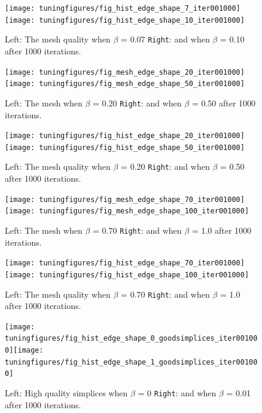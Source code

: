 \documentclass[10pt,a4paper]{book}
\begin{document}
\begin{figure}[tbhp]
\centerline{\texttt{[image: tuningfigures/fig\_hist\_edge\_shape\_7\_iter001000]}\hspace{3cm}\texttt{[image: tuningfigures/fig\_hist\_edge\_shape\_10\_iter001000]}}
\caption{\label{fig:fig_hist_edge_shape_7_iter001000} Left: The mesh quality when $\beta$ = 0.07 \texttt{Right}: and when $\beta$ = 0.10 after 1000 iterations.}
\end{figure}

\begin{figure}[tbhp]
\centerline{\texttt{[image: tuningfigures/fig\_mesh\_edge\_shape\_20\_iter001000]}\hspace{3cm}\texttt{[image: tuningfigures/fig\_mesh\_edge\_shape\_50\_iter001000]}}
\caption{\label{fig:fig_mesh_edge_shape_20_iter001000} Left: The mesh when $\beta$ = 0.20 \texttt{Right}: and when $\beta$ = 0.50 after 1000 iterations.}
\end{figure}

\begin{figure}[tbhp]
\centerline{\texttt{[image: tuningfigures/fig\_hist\_edge\_shape\_20\_iter001000]}\hspace{3cm}\texttt{[image: tuningfigures/fig\_hist\_edge\_shape\_50\_iter001000]}}
\caption{\label{fig:fig_hist_edge_shape_20_iter001000} Left: The mesh quality when $\beta$ = 0.20 \texttt{Right}: and when $\beta$ = 0.50 after 1000 iterations.}
\end{figure}

\begin{figure}[tbhp]
\centerline{\texttt{[image: tuningfigures/fig\_mesh\_edge\_shape\_70\_iter001000]}\hspace{3cm}\texttt{[image: tuningfigures/fig\_mesh\_edge\_shape\_100\_iter001000]}}
\caption{\label{fig:fig_mesh_edge_shape_70_iter001000} Left: The mesh when $\beta$ = 0.70 \texttt{Right}: and when $\beta$ = 1.0 after 1000 iterations.}
\end{figure}

\begin{figure}[tbhp]
\centerline{\texttt{[image: tuningfigures/fig\_hist\_edge\_shape\_70\_iter001000]}\hspace{3cm}\texttt{[image: tuningfigures/fig\_hist\_edge\_shape\_100\_iter001000]}}
\caption{\label{fig:fig_hist_edge_shape_70_iter001000} Left: The mesh quality when $\beta$ = 0.70 \texttt{Right}: and when $\beta$ = 1.0 after 1000 iterations.}
\end{figure}

\clearpage
\begin{figure}[tbhp]
\centerline{\texttt{[image: tuningfigures/fig\_hist\_edge\_shape\_0\_goodsimplices\_iter001000]}\hspace{3cm}\texttt{[image: tuningfigures/fig\_hist\_edge\_shape\_1\_goodsimplices\_iter001000]}}
\caption{\label{fig:fig_hist_edge_shape_0_goodsimplices_iter001000} Left: High quality simplices when $\beta$ = 0 \texttt{Right}: and when $\beta$ = 0.01 after 1000 iterations.}
\end{figure}
\end{document}
